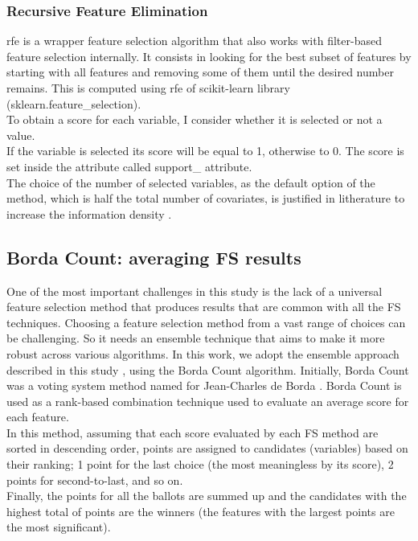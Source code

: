\subsubsection{Recursive Feature Elimination}
\gls{rfe} is a wrapper feature selection algorithm that also works with filter-based feature selection internally.\newline
It consists in looking for the best subset of features by starting with all features and removing some of them until the desired number remains.\newline
This is computed using \acrshort{rfe} of scikit-learn library (sklearn.feature\_selection).\\
To obtain a score for each variable, I consider whether it is selected or not a value.\\
If the variable is selected its score will be equal to 1, otherwise to 0. The score is set inside the attribute called support\_ attribute.\\
The choice of the number of selected variables, as the default option of the method, which is half the total number of covariates, is justified in litherature to increase the information density \cite{escanilla2018recursive}.
\pagebreak
\subsection{Borda Count: averaging FS results}
One of the most important challenges in this study is the lack of a universal feature selection method that produces results that are common with all the FS techniques. Choosing a feature selection method from a vast range of choices can be challenging. \newline
So it needs an ensemble technique that aims to make it more robust across various algorithms. In this work, we adopt the ensemble approach described in this study \cite{sarkar2014robust}, using the Borda Count algorithm. Initially, Borda Count was a voting system method named for Jean-Charles de Borda \cite{borda1784memoire}.\newline
Borda Count is used as a rank-based combination technique used to evaluate an average score for each feature. \\In this method, assuming that each score evaluated by each FS method are sorted in descending order, points are assigned to candidates (variables) based on their ranking; 1 point for the last choice (the most meaningless by its score), 2 points for second-to-last, and so on. \\Finally, the points for all the ballots are summed up and the candidates with the highest total of points are the winners (the features with the largest points are the most significant).
\bigskip
